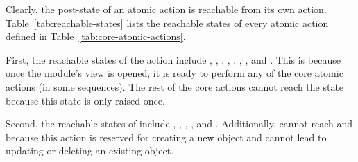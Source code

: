 %
Clearly, the post-state of an atomic action is reachable from its own action. Table~\ref{tab:reachable-states} lists the reachable states of every atomic action defined in Table~\ref{tab:core-atomic-actions}.

First, the reachable states of the action  include , , , , , , , and . This is because once the module's view is opened, it is ready to perform any of the core atomic actions (in some sequences). The rest of the core actions cannot reach the state  because this state is only raised once. 

Second, the reachable states of  include , , , , and . Additionally,  cannot reach  and  because this action is reserved for creating a new object and cannot lead to updating or deleting an existing object.

